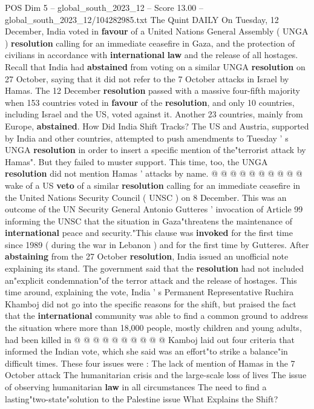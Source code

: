 \begin{textsample}{POS Dim 5 – global\_south\_2023\_12 – Score 13.00 – global\_south\_2023\_12/104282985.txt}  \label{ex:f5_pos_110}
The Quint DAILY On Tuesday, 12 December, India voted in \textbf{favour} of a United Nations General Assembly ( UNGA ) \textbf{resolution} calling for an immediate ceasefire in Gaza, and the protection of civilians in accordance with \textbf{international} \textbf{law} and the release of all hostages.
Recall that India had \textbf{abstained} from voting on a similar UNGA \textbf{resolution} on 27 October, saying that it did not refer to the 7 October attacks in Israel by Hamas.
The 12 December \textbf{resolution} passed with a massive four-fifth majority when 153 countries voted in \textbf{favour} of the \textbf{resolution}, and only 10 countries, including Israel and the US, voted against it.
Another 23 countries, mainly from Europe, \textbf{abstained}.
How Did India Shift Tracks?
The US and Austria, supported by India and other countries, attempted to push amendments to Tuesday ' s UNGA \textbf{resolution} in order to insert a specific mention of the"terrorist attack by Hamas".
But they failed to muster support.
This time, too, the UNGA \textbf{resolution} did not mention Hamas ' attacks by name. @ @ @ @ @ @ @ @ @ @ wake of a US \textbf{veto} of a similar \textbf{resolution} calling for an immediate ceasefire in the United Nations Security Council ( UNSC ) on 8 December.
This was an outcome of the UN Security General Antonio Gutteres ' invocation of Article 99 informing the UNSC that the situation in Gaza"threatens the maintenance of \textbf{international} peace and security."This clause was \textbf{invoked} for the first time since 1989 ( during the war in Lebanon ) and for the first time by Gutteres.
After \textbf{abstaining} from the 27 October \textbf{resolution}, India issued an unofficial note explaining its stand.
The government said that the \textbf{resolution} had not included an"explicit condemnation"of the terror attack and the release of hostages.
This time around, explaining the vote, India ' s Permanent Representative Ruchira Khamboj did not go into the specific reasons for the shift, but praised the fact that the \textbf{international} community was able to find a common ground to address the situation where more than 18,000 people, mostly children and young adults, had been killed in @ @ @ @ @ @ @ @ @ @ Kamboj laid out four criteria that informed the Indian vote, which she said was an effort"to strike a balance"in difficult times.
These four issues were : The lack of mention of Hamas in the 7 October attack The humanitarian crisis and the large-scale loss of lives The issue of observing humanitarian \textbf{law} in all circumstances The need to find a lasting"two-state"solution to the Palestine issue What Explains the Shift?

\end{textsample}

